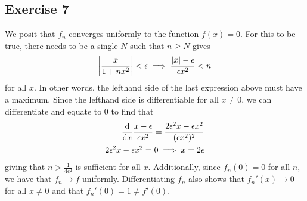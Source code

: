 \subsection{Exercise 7}
We posit that $f_n$ converges uniformly to the function $f(x) = 0$. For this to be true, there needs to be a
single $N$ such that $n \geq N$ gives
\begin{align*}
        \abs{\frac{x}{1 + nx^2}} < \epsilon \implies \frac{\abs{x} - \epsilon}{\epsilon x^2} < n
\end{align*}
for all $x$. In other words, the lefthand side of the last expression above must have a maximum. Since the 
lefthand side is differentiable for all $x \neq 0$, we can differentiate and equate to 0 to find that 
\begin{align*}
        \dv{x} \frac{x - \epsilon}{\epsilon x^2} = \frac{2\epsilon^2 x - \epsilon x^2}{(\epsilon x^2)^2} \\
        2\epsilon^2 x - \epsilon x^2 = 0 \implies x = 2 \epsilon
\end{align*}
giving that $n > \frac{1}{4\epsilon^2}$ is sufficient for all $x$. Additionally, since $f_n(0) = 0$ for all
$n$, we have that $f_n \to f$ uniformly. Differentiating $f_n$ also shows that $f_n'(x) \to 0$ for all
$x \neq 0$ and that $f_n'(0) = 1 \neq f'(0)$.
